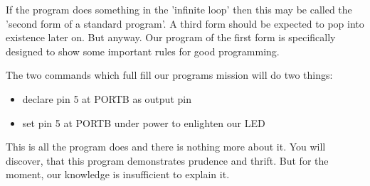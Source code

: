 If the program does something in the 'infinite loop' then this may be called the 'second form of a standard program'. A third form should be expected to pop into existence later on. But anyway. Our program of the first form is specifically designed to show some important rules for good programming.

The two commands which full fill our programs mission will do two things:

\begin{itemize}
  \item{declare pin 5 at PORTB as output pin}
  \item{set pin 5 at PORTB under power to enlighten our LED}
\end{itemize}

This is all the program does and there is nothing more about it. You will discover, that this program demonstrates prudence and thrift. But for the moment, our knowledge is insufficient to explain it.


